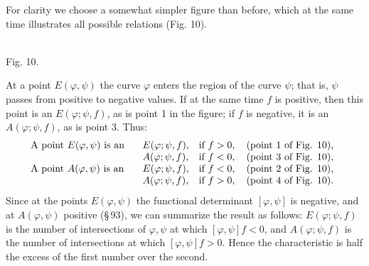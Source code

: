 \documentclass[11pt]{article}
\begin{document}
For clarity we choose a somewhat simpler figure than before, which at the same time illustrates all possible relations (Fig. 10).


\begin{center}
\\[-0.2em]
{\small Fig. 10.}
\end{center}


At a point $E(\varphi,\psi)$ the curve $\varphi$ enters the region of the curve $\psi$; that is, $\psi$ passes from positive to negative values. If at the same time $f$ is positive, then this point is an $E(\varphi;\psi,f)$, as is point 1 in the figure; if $f$ is negative, it is an $A(\varphi;\psi,f)$, as is point 3. Thus:
\[
\begin{array}{ll}
\hbox{A point }E(\varphi,\psi)\hbox{ is an }&
\begin{array}[t]{ll}
E(\varphi;\psi,f),&\hbox{if } f>0,\quad \hbox{(point 1 of Fig. 10),}\\
A(\varphi;\psi,f),&\hbox{if } f<0,\quad \hbox{(point 3 of Fig. 10),}
\end{array}\\[1.1em]
\hbox{A point }A(\varphi,\psi)\hbox{ is an }&
\begin{array}[t]{ll}
E(\varphi;\psi,f),&\hbox{if } f<0,\quad \hbox{(point 2 of Fig. 10),}\\
A(\varphi;\psi,f),&\hbox{if } f>0,\quad \hbox{(point 4 of Fig. 10).}
\end{array}
\end{array}
\]
Since at the points $E(\varphi,\psi)$ the functional determinant $[\varphi,\psi]$ is negative, and at $A(\varphi,\psi)$ positive (\S\,93), we can summarize the result as follows: $E(\varphi;\psi,f)$ is the number of intersections of $\varphi,\psi$ at which $[\varphi,\psi]f<0$, and $A(\varphi;\psi,f)$ is the number of intersections at which $[\varphi,\psi]f>0$. Hence the characteristic is half the excess of the first number over the second.
\end{document}
